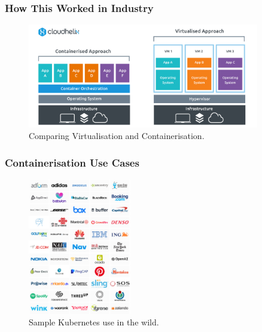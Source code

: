 \documentclass[aspectratio=169]{beamer}
\begin{document}
  \begin{frame}
    \frametitle{How This Worked in Industry}
    \begin{figure}[th!]
      \centering
      \includegraphics[width=0.9\textwidth]{containerisation.png}
      \caption{Comparing Virtualisation and Containerisation.}
      \label{fig:containerisation}
    \end{figure}
  \end{frame}

  \begin{frame}
    \frametitle{Containerisation Use Cases}
    \begin{figure}[th!]
      \centering
      \includegraphics[width=0.4\textwidth]{kube_case_studies.png}
      \caption{Sample Kubernetes use in the wild. \autocite{kube_cases}}
      \label{fig:kube_use}
    \end{figure}
  \end{frame}
\end{document}
